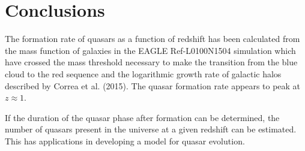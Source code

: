 \documentclass[12pt, twocolumn]{report}%
\begin{document}
\section{Conclusions}

The formation rate of quasars as a function of redshift has been calculated from the mass function of galaxies in the EAGLE Ref-L0100N1504 simulation which have crossed the mass threshold necessary to make the transition from the blue cloud to the red sequence and the logarithmic growth rate of galactic halos described by Correa et al. (2015). The quasar formation rate appears to peak at $z\approx1$.\par

If the duration of the quasar phase after formation can be determined, the number of quasars present in the universe at a given redshift can be estimated. This has applications in developing a model for quasar evolution.


\end{document}
